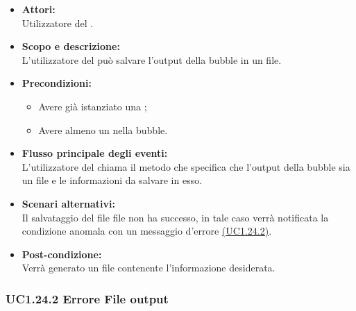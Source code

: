\begin{itemize}
	\item \textbf{Attori:}
	\\Utilizzatore del .
	\item \textbf{Scopo e descrizione:} 
	\\L’utilizzatore del  può salvare l’output della bubble in un file.
	\item \textbf{Precondizioni:}
	\begin{itemize}
		\item Avere già istanziato una ;
		\item Avere almeno un  nella bubble.
	\end{itemize}
	\item \textbf{Flusso principale degli eventi:}
	\\L’utilizzatore del  chiama il metodo che specifica che l’output della bubble sia un file e le informazioni da salvare in esso.
	\item \textbf{Scenari alternativi:}
	\\Il salvataggio del file file non ha successo, in tale caso verrà notificata la condizione anomala con un messaggio d’errore \hyperref[UC1.24.2]{(UC1.24.2)}.
	\item \textbf{Post-condizione:}
	\\Verrà generato un file contenente l'informazione desiderata.
\end{itemize}

\subsubsection{UC1.24.2 Errore File output} \label{UC1.24.2}

